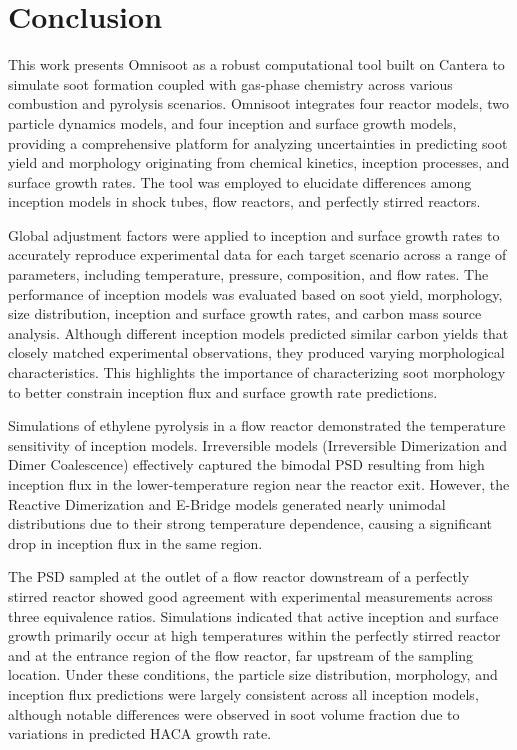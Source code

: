 \section{Conclusion}

This work presents Omnisoot as a robust computational tool built on Cantera to simulate soot formation coupled with gas-phase chemistry across various combustion and pyrolysis scenarios. Omnisoot integrates four reactor models, two particle dynamics models, and four inception and surface growth models, providing a comprehensive platform for analyzing uncertainties in predicting soot yield and morphology originating from chemical kinetics, inception processes, and surface growth rates. The tool was employed to elucidate differences among inception models in shock tubes, flow reactors, and perfectly stirred reactors.

Global adjustment factors were applied to inception and surface growth rates to accurately reproduce experimental data for each target scenario across a range of parameters, including temperature, pressure, composition, and flow rates. The performance of inception models was evaluated based on soot yield, morphology, size distribution, inception and surface growth rates, and carbon mass source analysis. Although different inception models predicted similar carbon yields that closely matched experimental observations, they produced varying morphological characteristics. This highlights the importance of characterizing soot morphology to better constrain inception flux and surface growth rate predictions.

Simulations of ethylene pyrolysis in a flow reactor demonstrated the temperature sensitivity of inception models. Irreversible models (Irreversible Dimerization and Dimer Coalescence) effectively captured the bimodal PSD resulting from high inception flux in the lower-temperature region near the reactor exit. However, the Reactive Dimerization and E-Bridge models generated nearly unimodal distributions due to their strong temperature dependence, causing a significant drop in inception flux in the same region.

The PSD sampled at the outlet of a flow reactor downstream of a perfectly stirred reactor showed good agreement with experimental measurements across three equivalence ratios. Simulations indicated that active inception and surface growth primarily occur at high temperatures within the perfectly stirred reactor and at the entrance region of the flow reactor, far upstream of the sampling location. Under these conditions, the particle size distribution, morphology, and inception flux predictions were largely consistent across all inception models, although notable differences were observed in soot volume fraction due to variations in predicted HACA growth rate.